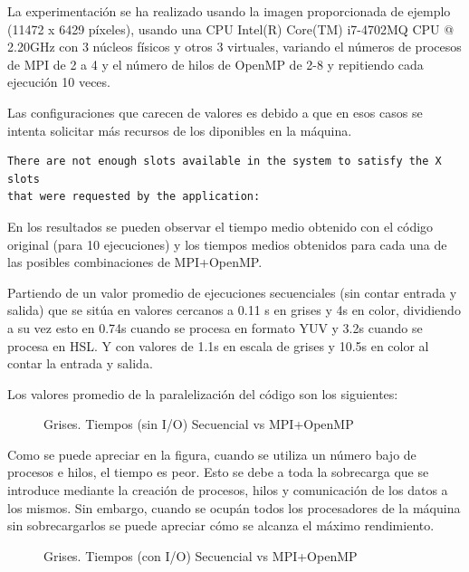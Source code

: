 \documentclass[12pt]{report} %
\begin{document}
La experimentación se ha realizado usando la imagen proporcionada de ejemplo (11472 x 6429 píxeles),
usando una CPU Intel(R) Core(TM) i7-4702MQ CPU @ 2.20GHz con 3 núcleos físicos y otros 3 virtuales, variando
el números de procesos de MPI de 2 a 4 y el número de hilos de OpenMP de 2-8 y repitiendo cada ejecución 10 veces.

Las configuraciones que carecen de valores es debido a que en esos casos se intenta solicitar más recursos de los diponibles en la máquina.

\begin{verbatim}
There are not enough slots available in the system to satisfy the X slots
that were requested by the application:
\end{verbatim}

En los resultados se pueden observar el tiempo medio obtenido con el código original (para 10 ejecuciones)
y los tiempos medios obtenidos para cada una de las posibles combinaciones de MPI+OpenMP.

Partiendo de un valor promedio de ejecuciones secuenciales (sin contar entrada y salida) que se sitúa en
valores cercanos a 0.11 s en grises y 4s en color, dividiendo a su vez esto en 0.74s cuando se procesa
en formato YUV y 3.2s cuando se procesa en HSL. Y con valores de 1.1s en escala de grises y 10.5s en color al contar la entrada y salida.

Los valores promedio de la paralelización del código son los siguientes:

\begin{figure}[H]
    \makebox[\textwidth][c]{
        
    }
    \caption{Grises. Tiempos (sin I/O) Secuencial vs MPI+OpenMP}
    \label{fig:tiempos_no_io_gris}
\end{figure}

Como se puede apreciar en la figura, cuando se utiliza un número bajo de procesos e hilos, el tiempo es
peor. Esto se debe a toda la sobrecarga que se introduce mediante la creación de procesos, hilos y
comunicación de los datos a los mismos. Sin embargo, cuando se ocupán todos los procesadores de la máquina
sin sobrecargarlos se puede apreciar cómo se alcanza el máximo rendimiento.

\begin{figure}[H]
    \makebox[\textwidth][c]{
        
    }
    \caption{Grises. Tiempos (con I/O) Secuencial vs MPI+OpenMP}
    \label{fig:tiempos_io_gris}
\end{figure}
\end{document}
